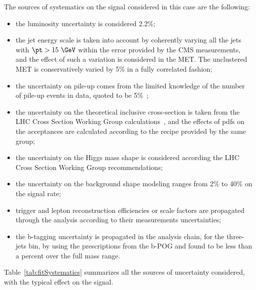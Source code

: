 The sources of systematics on the signal considered in this case are the following:
\begin{itemize}
\item the luminosity uncertainty is considered 2.2\%;
\item the jet energy scale is taken into account by coherently varying all the jets with $\pt>15~\GeV$
      within the error provided by the CMS measurements, and the effect of such a variation is
      considered in the MET. The unclustered MET is conservatively varied by 5\% in a fully
      correlated fashion;
\item the uncertainty on pile-up comes from the limited knowledge of the number of pile-up events in
      data, quoted to be 5\%~\cite{PUScaling};
\item the uncertainty on the theoretical inclusive cross-section is taken from the LHC Cross Section
      Working Group calculations~\cite{LHCHiggsCrossSectionWorkingGroup:2011ti}, and the effects of
      pdfs on the acceptances are calculated according to the recipe provided by the same group;
\item the uncertainty on the Higgs mass shape is considered according the LHC Cross Section Working
      Group recommendations;
\item the uncertainty on the background shape modeling ranges from 2\% to 40\% on the signal rate;
\item trigger and lepton reconstruction efficiencies or scale factors are propagated through the
      analysis according to their measurements uncertainties;
\item the b-tagging uncertainty is propagated in the analysis chain, for the three-jets bin, by using
      the prescriptions from the b-POG and found to be less than a percent over the full mass range.
\end{itemize}
Table~\ref{tab:fitSystematics} summarizes all the sources of uncertainty considered, with the
typical effect on the signal.

